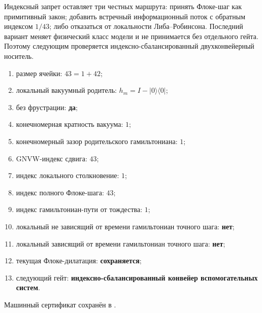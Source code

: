 Индексный запрет оставляет три честных маршрута: принять Флоке-шаг как
примитивный закон; добавить встречный информационный поток с обратным
индексом $1/43$; либо отказаться от локальности Либа--Робинсона. Последний
вариант меняет физический класс модели и не принимается без отдельного
гейта. Поэтому следующим проверяется индексно-сбалансированный
двухконвейерный носитель.

\begin{protocol}
\begin{enumerate}
 \item размер ячейки: \textbf{$43=1+42$};
 \item локальный вакуумный родитель: \textbf{$h_m=I-|0\rangle\langle0|$};
 \item без фрустрации: \textbf{да};
 \item конечномерная кратность вакуума: \textbf{$1$};
 \item конечномерный зазор родительского гамильтониана: \textbf{$1$};
 \item GNVW-индекс сдвига: \textbf{$43$};
 \item индекс локального столкновение: \textbf{$1$};
 \item индекс полного Флоке-шага: \textbf{$43$};
 \item индекс гамильтониан-пути от тождества: \textbf{$1$};
 \item локальный не зависящий от времени гамильтониан точного шага: \textbf{нет};
 \item локальный зависящий от времени гамильтониан точного шага: \textbf{нет};
 \item текущая Флоке-дилатация: \textbf{сохраняется};
 \item следующий гейт: \textbf{индексно-сбалансированный конвейер вспомогательных систем}.
\end{enumerate}
\end{protocol}

Машинный сертификат сохранён в
.